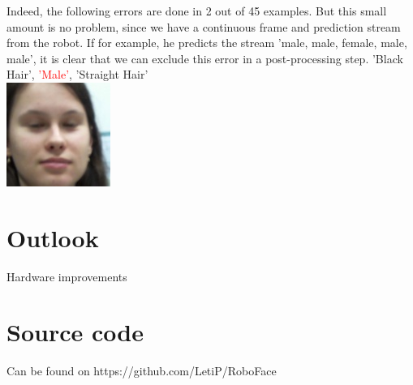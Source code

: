 \documentclass[12.5pt]{scrartcl}
\begin{document}
	Indeed, the following errors are done in 2 out of 45 examples. But this small amount is no problem, since we have a continuous frame and prediction stream from the robot. If for example, he predicts the stream 'male, male, female, male, male', it is clear that we can exclude this error in a post-processing step.
	'Black Hair', \textcolor{red}{'Male'}, 'Straight Hair'\\
	\includegraphics[height=0.2\textheight]{images/leti_normalised0}
	\section{Outlook}
	Hardware improvements
	\section{Source code}
	Can be found on	https://github.com/LetiP/RoboFace
	
\end{document}
